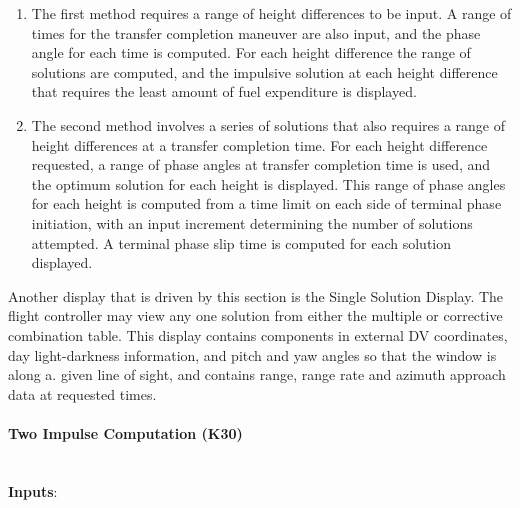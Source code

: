 \documentclass[11pt]{article} %
\begin{document}
\begin{enumerate}
	\item The first method requires a range of height differences to be input. A range of times for the transfer completion maneuver are also input, and the phase angle for each time is computed. For each height difference the range of solutions are computed, and the impulsive solution at each height difference that requires the least amount of fuel expenditure is displayed.
	\item The second method involves a series of solutions that also requires a range of height differences at a transfer completion time. For each height difference requested, a range of phase angles at transfer completion time is used, and the optimum solution for each height is displayed. This range of phase angles for each height is computed from a time limit on each side of terminal phase initiation, with an input increment determining the number of solutions attempted. A terminal phase slip time is computed for each solution displayed.
\end{enumerate}

Another display that is driven by this section is the Single Solution Display. The flight controller may view any one solution from either the multiple or corrective
combination table. This display contains components in external DV coordinates, day light-darkness information, and pitch and yaw angles so that the window is along a. given line of sight, and contains range, range rate and azimuth approach data at requested times.\\

\paragraph{Two Impulse Computation (K30)}\mbox{} \\

\textbf{Inputs}:\\
\end{document}
